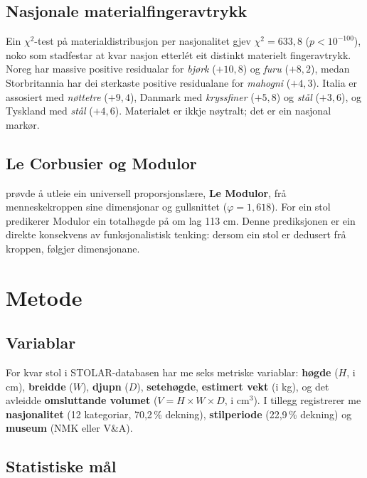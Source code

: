 \documentclass[10pt, a4paper, twocolumn]{article}
\begin{document}
\subsection{Nasjonale materialfingeravtrykk}

Ein $\chi^2$-test på materialdistribusjon per nasjonalitet gjev $\chi^2 = 633{,}8$ ($p < 10^{-100}$), noko som stadfestar at kvar nasjon etterlét eit distinkt materielt fingeravtrykk. Noreg har massive positive residualar for \emph{bjørk} ($+10{,}8$) og \emph{furu} ($+8{,}2$), medan Storbritannia har dei sterkaste positive residualane for \emph{mahogni} ($+4{,}3$). Italia er assosiert med \emph{nøttetre} ($+9{,}4$), Danmark med \emph{kryssfiner} ($+5{,}8$) og \emph{stål} ($+3{,}6$), og Tyskland med \emph{stål} ($+4{,}6$). Materialet er ikkje nøytralt; det er ein nasjonal markør.

\subsection{Le Corbusier og Modulor}

\citet{lecorbusier1950} prøvde å utleie ein universell proporsjonslære, \textbf{Le Modulor}, frå menneskekroppen sine dimensjonar og gullsnittet ($\varphi = 1{,}618$). For ein stol predikerer Modulor ein totalhøgde på om lag 113 cm. Denne prediksjonen er ein direkte konsekvens av funksjonalistisk tenking: dersom ein stol er dedusert frå kroppen, følgjer dimensjonane.


\section{Metode}

\subsection{Variablar}

For kvar stol i STOLAR-databasen har me seks metriske variablar: \textbf{høgde} ($H$, i cm), \textbf{breidde} ($W$), \textbf{djupn} ($D$), \textbf{setehøgde}, \textbf{estimert vekt} (i kg), og det avleidde \textbf{omsluttande volumet} ($V = H \times W \times D$, i cm$^3$). I tillegg registrerer me \textbf{nasjonalitet} (12 kategoriar, 70,2\,\% dekning), \textbf{stilperiode} (22,9\,\% dekning) og \textbf{museum} (NMK eller V\&A).

\subsection{Statistiske mål}
\end{document}
